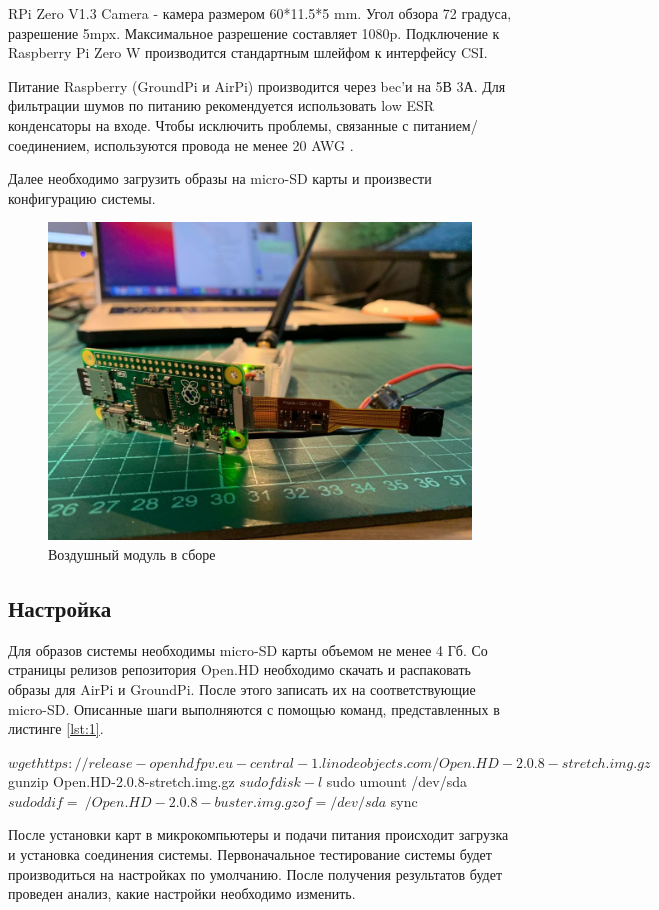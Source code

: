 RPi Zero V1.3 Camera -  камера размером 60*11.5*5 mm. Угол обзора 72 градуса, разрешение 5mpx. Максимальное разрешение составляет 1080p. Подключение к Raspberry Pi Zero W производится стандартным шлейфом к интерфейсу CSI. 

Питание Raspberry (GroundPi и AirPi) производится через bec'и на 5В 3А. Для фильтрации шумов по питанию рекомендуется использовать low ESR конденсаторы на входе. Чтобы исключить проблемы, связанные с питанием/соединением, используются провода не менее 20 AWG \cite{openhd}.

Далее необходимо загрузить образы на micro-SD карты и произвести конфигурацию системы.
\begin{figure}[H]
	\centering
	\includegraphics[width=0.5\linewidth]{pics/photo4}
	\caption{ Воздушный модуль в сборе
	}
	\label{fig:photo4}
\end{figure}

\subsection{Настройка}

Для образов системы необходимы micro-SD карты объемом не менее 4 Гб. Со страницы релизов репозитория Open.HD необходимо скачать и распаковать  образы для AirPi и GroundPi. После этого записать их на соответствующие micro-SD. Описанные шаги выполняются с помощью команд, представленных в листинге \ref{lst:1}.

\begin{Program}[H]
	\caption{Команды для записи образов} \label{lst:1}
	\begin{MyCode}
$ wget https://release-openhdfpv.eu-central-1.linodeobjects.com/Open.HD-2.0.8-stretch.img.gz
$ gunzip Open.HD-2.0.8-stretch.img.gz
$ sudo fdisk -l
$ sudo umount /dev/sda
$ sudo dd if=~/Open.HD-2.0.8-buster.img.gz of=/dev/sda
$ sync
	\end{MyCode}
\end{Program}

После установки карт в микрокомпьютеры и подачи питания происходит загрузка и установка соединения системы. Первоначальное тестирование системы будет производиться на настройках по умолчанию. После получения результатов будет проведен анализ, какие настройки необходимо изменить.


